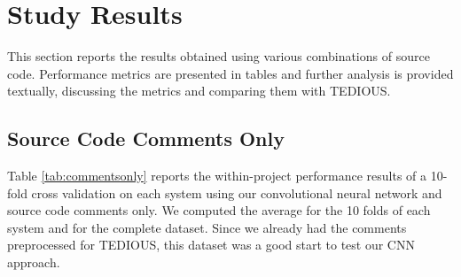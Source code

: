 \section{Study Results}

This section reports the results obtained using various combinations of source code. Performance metrics are presented in tables and further analysis is provided textually, discussing the metrics and comparing them with TEDIOUS.

\subsection{Source Code Comments Only}


Table \ref{tab:commentsonly} reports the within-project performance results of a 10-fold cross validation on each system using our convolutional neural network and source code comments only. We computed the average for the 10 folds of each system and for the complete dataset. Since we already had the comments preprocessed for TEDIOUS, this dataset was a good start to test our CNN approach.

\begin{table}[t]
	\caption{Within-project prediction: results of CNN for each system using source code comments only}
	\label{tab:commentsonly}
	\centering\scriptsize
	\vspace{-3mm}
\end{table}

